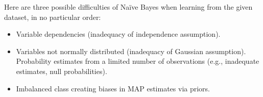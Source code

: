 \documentclass[12pt]{article}
\begin{document}
\begin{enumerate}[leftmargin=\labelsep]
          \vskip 0.3cm
          Here are three possible difficulties of Naïve Bayes when learning from the given dataset,
          in no particular order:

          \begin{itemize} %
              \item Variable dependencies (inadequacy of independence assumption).
              \item Variables not normally distributed (inadequacy of Gaussian assumption). Probability estimates from a limited number of observations (e.g., inadequate estimates, null probabilities).
              \item Imbalanced class creating biases in MAP estimates via priors.
          \end{itemize}
\end{enumerate}
\end{document}
